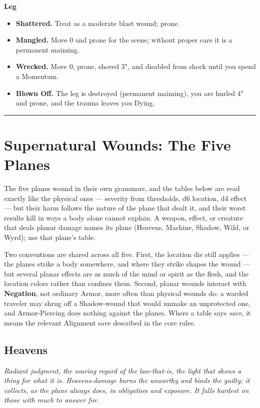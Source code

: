 \textbf{Leg}
\begin{itemize}
    \item[1] \textbf{Shattered.} Treat as a moderate blast wound; prone.
    \item[2] \textbf{Mangled.} Move 0 and prone for the scene; without proper care it is a permanent maiming.
    \item[3] \textbf{Wrecked.} Move 0, prone, shoved 3", and disabled from shock until you spend a Momentum.
    \item[4] \textbf{Blown Off.} The leg is destroyed (permanent maiming), you are hurled 4" and prone, and the trauma leaves you Dying.
\end{itemize}

\medskip\hrule\medskip

\section{Supernatural Wounds: The Five Planes}

The five planes wound in their own grammars, and the tables below are read exactly like the physical ones --- severity from thresholds, d6 location, d4 effect --- but their harm follows the nature of the plane that dealt it, and their worst results kill in ways a body alone cannot explain. A weapon, effect, or creature that deals planar damage names its plane (Heavens, Machine, Shadow, Wild, or Wyrd); use that plane's table.

Two conventions are shared across all five. First, the location die still applies --- the planes strike a body somewhere, and where they strike shapes the wound --- but several planar effects are as much of the mind or spirit as the flesh, and the location colors rather than confines them. Second, planar wounds interact with \textbf{Negation}, not ordinary Armor, more often than physical wounds do: a warded traveler may shrug off a Shadow-wound that would unmake an unprotected one, and Armor-Piercing does nothing against the planes. Where a table says \textit{save}, it means the relevant Alignment save described in the core rules.

\subsection{Heavens}

\textit{Radiant judgment, the searing regard of the law-that-is, the light that shows a thing for what it is. Heavens-damage burns the unworthy and binds the guilty; it collects, as the plane always does, in obligation and exposure. It falls hardest on those with much to answer for.}

